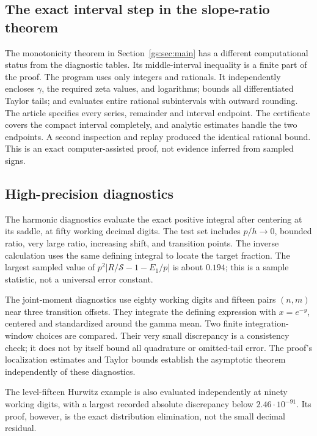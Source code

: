 \subsection{The exact interval step in the slope-ratio theorem}

The monotonicity theorem in Section~\ref{gs:sec:main} has a different
computational status from the diagnostic tables. Its middle-interval
inequality is a finite part of the proof. The program
 uses only integers and
rationals. It independently encloses $\gamma$, the required zeta
values, and logarithms; bounds all differentiated Taylor tails;
and evaluates entire rational subintervals with outward rounding.
The article specifies every series, remainder and interval endpoint.
The certificate covers the compact interval completely, and
analytic estimates handle the two endpoints. A second inspection
and replay produced the identical rational bound. This is an exact
computer-assisted proof, not evidence inferred from sampled signs.

\subsection{High-precision diagnostics}

The harmonic diagnostics evaluate the exact positive integral after
centering at its saddle, at fifty working decimal digits. The test
set includes $p/h\to0$, bounded ratio, very large ratio, increasing
shift, and transition points. The inverse calculation uses the same
defining integral to locate the target fraction. The largest sampled
value of $p^2|R/\mathcal S-1-E_1/p|$ is about $0.194$; this
is a sample statistic, not a universal error constant.

The joint-moment diagnostics use eighty working digits and fifteen
pairs $(n,m)$ near three transition offsets. They integrate the
defining expression with $x=e^{-y}$, centered and standardized
around the gamma mean. Two finite integration-window choices are
compared. Their very small discrepancy is a consistency check; it
does not by itself bound all quadrature or omitted-tail error.
The proof's localization estimates and Taylor bounds establish the
asymptotic theorem independently of these diagnostics.

The level-fifteen Hurwitz example is also evaluated independently at
ninety working digits, with a largest recorded absolute discrepancy
below $2.46\cdot10^{-91}$. Its proof, however, is the exact
distribution elimination, not the small decimal residual.

